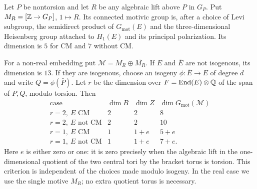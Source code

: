 \begin{statement}
Let $P$ be nontorsion and let $R$ be any algebraic lift above
$P$ in $G_P$. Put $M_R=[\mathbb Z\to G_P]$, $1\mapsto R$.
Its connected motivic group is, after a choice of Levi subgroup,
the semidirect product of $G_{\mathrm{mot}}(E)$ and the
three-dimensional Heisenberg group attached to $H_1(E)$ and
its principal polarization. Its dimension is $5$ for CM and
$7$ without CM.

For a non-real embedding put
$\mathcal M=M_R\oplus\overline{M_R}$.
If $E$ and $\bar E$ are not isogenous, its dimension is $13$.
If they are isogenous, choose an isogeny
$\phi:\bar E\to E$ of degree $d$ and write
$Q=\phi(\bar P)$. Let $r$ be the dimension over
$F=\operatorname{End}(E)\otimes\mathbb Q$ of the span of $P,Q$, modulo torsion.
Then
\[
\begin{array}{c|c|c|c}
\text{case}&\dim B&\dim Z&\dim G_{\mathrm{mot}}(\mathcal M)\\ \hline
r=2,\ E\text{ CM}&2&2&8\\
r=2,\ E\text{ not CM}&2&2&10\\
r=1,\ E\text{ CM}&1&1+e&5+e\\
r=1,\ E\text{ not CM}&1&1+e&7+e.
\end{array}
\]
Here $e$ is either zero or one: it is zero precisely when the
algebraic lift in the one-dimensional quotient of the two
central tori by the bracket torus is torsion. This criterion is
independent of the choices made modulo isogeny. In the real
case we use the single motive $M_R$; no extra quotient torus
is necessary.
\end{statement}
